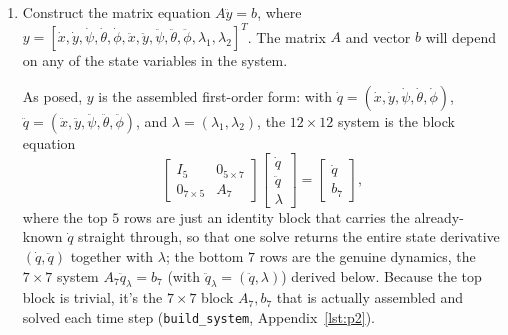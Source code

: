\documentclass[11pt]{article}
\begin{document}
\begin{enumerate}[label=(\alph*)]
    \item Construct the matrix equation $A\ddot y = b$, where $y = [\dot x,\dot y,\dot\psi,\dot\theta,\dot\phi,\ddot x,\ddot y,\ddot\psi,\ddot\theta,\ddot\phi,\lambda_1,\lambda_2]^T$. The matrix $A$ and vector $b$ will depend on any of the state variables in the system.

    As posed, $y$ is the assembled first-order form: with $\dot q=(\dot x,\dot y,\dot\psi,\dot\theta,\dot\phi)$, $\ddot q=(\ddot x,\ddot y,\ddot\psi,\ddot\theta,\ddot\phi)$, and $\lambda=(\lambda_1,\lambda_2)$, the $12\times12$ system is the block equation
    $$\begin{bmatrix} I_5 & 0_{5\times7}\\[2pt] 0_{7\times5} & A_7\end{bmatrix}\begin{bmatrix}\dot q\\ \ddot q\\ \lambda\end{bmatrix} = \begin{bmatrix}\dot q\\ b_7\end{bmatrix},$$
    where the top $5$ rows are just an identity block that carries the already-known $\dot q$ straight through, so that one solve returns the entire state derivative $(\dot q,\ddot q)$ together with $\lambda$; the bottom $7$ rows are the genuine dynamics, the $7\times7$ system $A_7\ddot q_\lambda=b_7$ (with $\ddot q_\lambda=(\ddot q,\lambda)$) derived below. Because the top block is trivial, it's the $7\times7$ block $A_7,b_7$ that is actually assembled and solved each time step (\texttt{build\_system}, Appendix~\ref{lst:p2}).


\end{enumerate}
\end{document}
